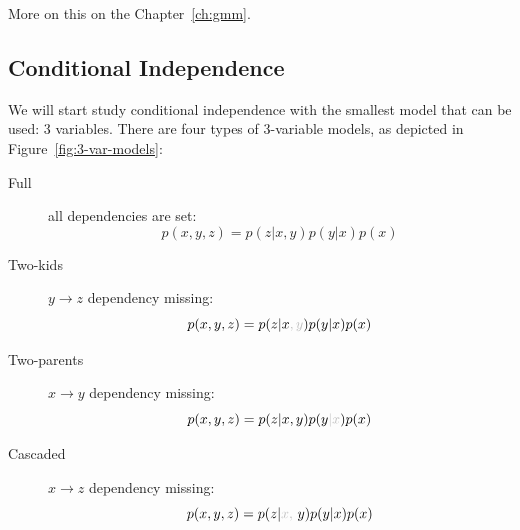 

 More on this on the Chapter~\ref{ch:gmm}.

\subsection{Conditional Independence}


We will start study conditional independence with the smallest model that can be used: 3 variables. There are four types of 3-variable models, as depicted in Figure~\ref{fig:3-var-models}:
\begin{description}
    \item[Full] all dependencies are set:
    \begin{equation}
    p(x,y,z) = p(z|x,y)p(y|x)p(x)
    \end{equation}
    \item[Two-kids] $y\rightarrow z$ dependency missing:
    \begin{equation}
    p(x,y,z) = p(z|x{\color{lightgray},y})p(y|x)p(x)
    \end{equation}
    \item[Two-parents] $x\rightarrow y$ dependency missing:
    \begin{equation}
    p(x,y,z) = p(z|x,y)p(y{\color{lightgray}|x})p(x)
    \end{equation}
    \item[Cascaded] $x\rightarrow z$ dependency missing:
    \begin{equation}
    p(x,y,z) = p(z|{\color{lightgray}x,}\ y)p(y|x)p(x)
    \end{equation}
\end{description}


